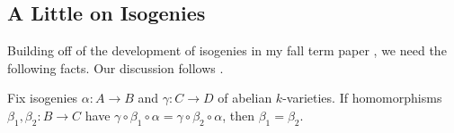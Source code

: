 \documentclass{amsart}
\begin{document}
\subsection{A Little on Isogenies}
Building off of the development of isogenies in my fall term paper \cite[Section~2.3]{elber-av}, we need the following facts. Our discussion follows \cite{egm-av}.
\begin{lemma} \label{lem:cancel-isos}
	Fix isogenies $\alpha\colon A\to B$ and $\gamma\colon C\to D$ of abelian $k$-varieties. If homomorphisms $\beta_1,\beta_2\colon B\to C$ have $\gamma\circ\beta_1\circ\alpha=\gamma\circ\beta_2\circ\alpha$, then $\beta_1=\beta_2$.
\end{lemma}
\end{document}
